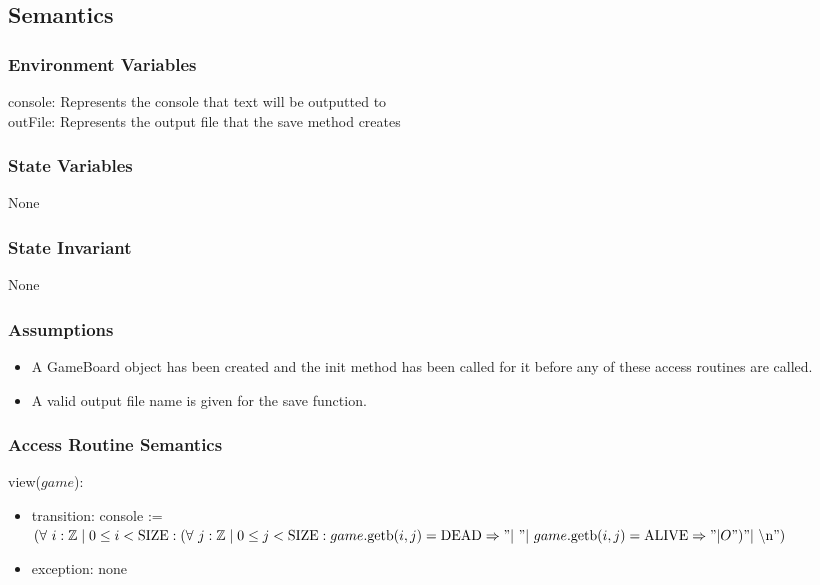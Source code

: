 \documentclass[12pt]{article}
\begin{document}
\subsection* {Semantics}

\subsubsection* {Environment Variables}

console: Represents the console that text will be outputted to\\
outFile: Represents the output file that the save method creates

\subsubsection* {State Variables}

None

\subsubsection* {State Invariant}

None

\subsubsection* {Assumptions}

\begin{itemize}
\item A GameBoard object has been created and the init method has been called for it before any of these access routines are called.
\item A valid output file name is given for the save function.
\end{itemize}

\subsubsection* {Access Routine Semantics}

\noindent view($game$):
\begin{itemize}
\item transition: console := $(\forall \ i : \mathbb{Z} \mid 0 \le i < \mbox{SIZE}: (\forall \ j : \mathbb{Z} \mid 0 \le j < \mbox{SIZE}: game.\mbox{getb}(i, j) = \mbox{DEAD} \Rightarrow "| \ " | \ game.\mbox{getb}(i, j) = \mbox{ALIVE} \Rightarrow "|O") "| \ \backslash \text{n}")$
\item exception: none
\end{itemize}
\end{document}
